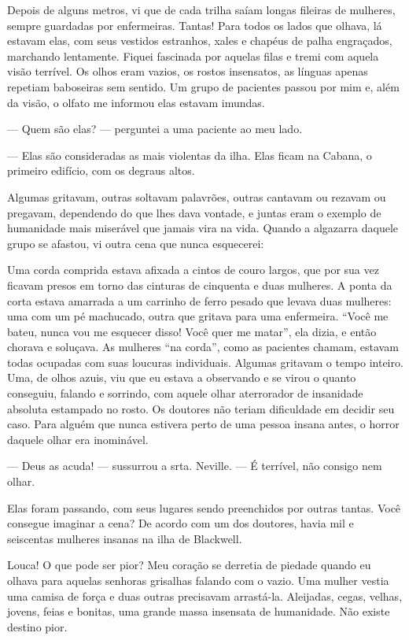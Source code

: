 Depois de alguns metros, vi que de cada trilha saíam longas fileiras de
mulheres, sempre guardadas por enfermeiras. Tantas! Para todos os lados
que olhava, lá estavam elas, com seus vestidos estranhos, xales e
chapéus de palha engraçados, marchando lentamente. Fiquei fascinada por
aquelas filas e tremi com aquela visão terrível. Os olhos eram vazios,
os rostos insensatos, as línguas apenas repetiam baboseiras sem sentido.
Um grupo de pacientes passou por mim e, além da visão, o olfato me
informou elas estavam imundas.

--- Quem são elas? --- perguntei a uma paciente ao meu lado.

--- Elas são consideradas as mais violentas da ilha. Elas ficam na
Cabana, o primeiro edifício, com os degraus altos. 

Algumas gritavam,
outras soltavam palavrões, outras cantavam ou rezavam ou pregavam,
dependendo do que lhes dava vontade, e juntas eram o exemplo de
humanidade mais miserável que jamais vira na vida. Quando a algazarra
daquele grupo se afastou, vi outra cena que nunca esquecerei:

Uma corda comprida estava afixada a cintos de couro largos, que por sua
vez ficavam presos em torno das cinturas de cinquenta e duas mulheres. A
ponta da corta estava amarrada a um carrinho de ferro pesado que levava
duas mulheres: uma com um pé machucado, outra que gritava para uma
enfermeira. ``Você me bateu, nunca vou me esquecer disso! Você quer
me matar'', ela dizia, e então chorava e soluçava. As mulheres ``na
corda'', como as pacientes chamam, estavam todas ocupadas com suas
loucuras individuais. Algumas gritavam o tempo inteiro. Uma, de olhos
azuis, viu que eu estava a observando e se virou o quanto conseguiu,
falando e sorrindo, com aquele olhar aterrorador de insanidade absoluta
estampado no rosto. Os doutores não teriam dificuldade em decidir seu
caso. Para alguém que nunca estivera perto de uma pessoa insana antes, o
horror daquele olhar era inominável.

--- Deus as acuda! --- sussurrou a srta. Neville. --- É terrível, não
consigo nem olhar.

Elas foram passando, com seus lugares sendo preenchidos por outras
tantas. Você consegue imaginar a cena? De acordo com um dos doutores,
havia mil e seiscentas mulheres insanas na ilha de Blackwell.

Louca! O que pode ser pior? Meu coração se derretia de piedade quando eu
olhava para aquelas senhoras grisalhas falando com o vazio. Uma mulher
vestia uma camisa de força e duas outras precisavam arrastá-la.
Aleijadas, cegas, velhas, jovens, feias e bonitas, uma grande massa
insensata de humanidade. Não existe destino pior.

